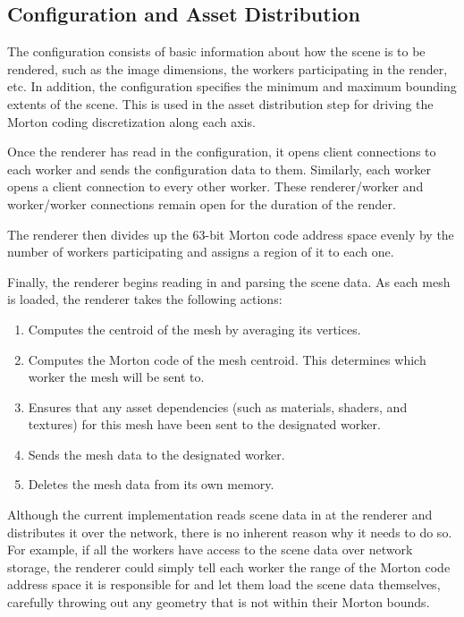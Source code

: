 \documentclass[12pt]{ucthesis}
\begin{document}
\subsection{Configuration and Asset Distribution}
\label{sync}

The configuration consists of basic information about how the scene is to be
rendered, such as the image dimensions, the workers participating in the render,
etc. In addition, the configuration specifies the minimum and maximum bounding
extents of the scene. This is used in the asset distribution step for driving
the Morton coding discretization along each axis.

Once the renderer has read in the configuration, it opens client connections
to each worker and sends the configuration data to them. Similarly, each worker
opens a client connection to every other worker. These renderer/worker and
worker/worker connections remain open for the duration of the render.

The renderer then divides up the 63-bit Morton code address space evenly by the
number of workers participating and assigns a region of it to each one.

Finally, the renderer begins reading in and parsing the scene data. As each mesh
is loaded, the renderer takes the following actions:

\begin{enumerate}
   \item Computes the centroid of the mesh by averaging its vertices.
   \item Computes the Morton code of the mesh centroid. This determines
      which worker the mesh will be sent to.
   \item Ensures that any asset dependencies (such as materials,
      shaders, and textures) for this mesh have been sent to the designated worker.
   \item Sends the mesh data to the designated worker.
   \item Deletes the mesh data from its own memory.
\end{enumerate}

Although the current implementation reads scene data in at the renderer
and distributes it over the network, there is no inherent reason why it needs to
do so. For example, if all the workers have access to the scene data over network
storage, the renderer could simply tell each worker the range of the Morton code
address space it is responsible for and let them load the scene data themselves,
carefully throwing out any geometry that is not within their Morton bounds.
\end{document}
